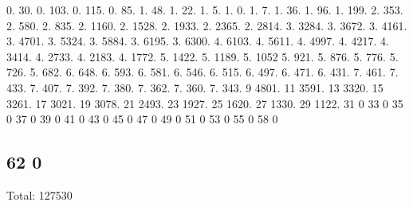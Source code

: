 0. 30. 0. 103. 0. 115. 0. 85. 1. 48. 1. 22. 1. 5. 1. 0. 1. 7. 1. 36. 1. 96. 1. 199. 2. 353. 2. 580. 2. 835. 2. 1160. 2. 1528. 2. 1933. 2. 2365. 2. 2814. 3. 3284. 3. 3672. 3. 4161. 3. 4701. 3. 5324. 3. 5884. 3. 6195. 3. 6300. 4. 6103. 4. 5611. 4. 4997. 4. 4217. 4. 3414. 4. 2733. 4. 2183. 4. 1772. 5. 1422. 5. 1189. 5. 1052 5. 921. 5. 876. 5. 776. 5. 726. 5. 682. 6. 648. 6. 593. 6. 581. 6. 546. 6. 515. 6. 497. 6. 471. 6. 431. 7. 461. 7. 433. 7. 407. 7. 392. 7. 380. 7. 362. 7. 360. 7. 343. 9 4801. 11 3591. 13 3320. 15 3261. 17 3021. 19 3078. 21 2493. 23 1927. 25 1620. 27 1330. 29 1122. 31 0 33 0 35 0 37 0 39 0 41 0 43 0 45 0 47 0 49 0 51 0 53 0 55 0 58 0 \subsection*{62 0 }

Total\+: 127530 